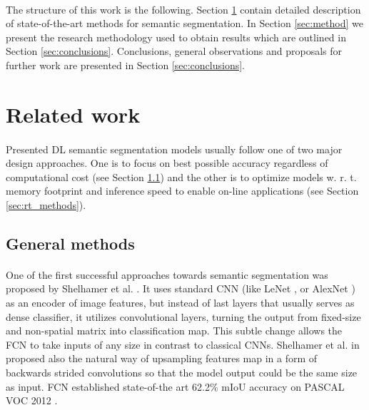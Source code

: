 \documentclass{article}
\begin{document}
\paragraph{}
The structure of this work is the following. Section \ref{sec:related_work} contain detailed description of state-of-the-art methods for semantic segmentation. In Section \ref{sec:method} we present the research methodology used to obtain results which are outlined in Section \ref{sec:conclusions}. Conclusions, general observations and proposals for further work are presented in Section \ref{sec:conclusions}.  

\section{Related work}
\label{sec:related_work}
\paragraph{}
Presented DL semantic segmentation models usually follow one of two major design approaches. One is to focus on best possible accuracy regardless of computational cost (see Section \ref{sec:gen_methods}) and the other is to optimize models w. r. t. memory footprint and inference speed to enable on-line applications (see Section \ref{sec:rt_methods}).

\subsection{General methods}
\label{sec:gen_methods}
\paragraph{}
One of the first successful approaches towards semantic segmentation was proposed by Shelhamer et al. \cite{fcn}. It uses standard CNN (like LeNet \cite{lenet}, or AlexNet \cite{alex}) as an encoder of image features, but instead of last layers that usually serves as dense classifier, it utilizes convolutional layers, turning the output from fixed-size and non-spatial matrix into classification map. This subtle change allows the FCN to take inputs of any size in contrast to classical CNNs. Shelhamer et al. in \cite{fcn} proposed also the natural way of upsampling features map in a form of backwards strided convolutions so that the model output could be the same size as input. FCN established state-of-the art 62.2\% mIoU accuracy on PASCAL VOC 2012 \cite{pascal_voc}.
\end{document}
